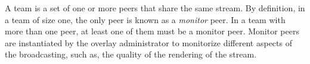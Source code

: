 
\label{sec:team_def}

A team is a set of one or more peers that share the same stream. By
definition, in a team of size one, the only peer is known as a
\emph{monitor} peer. In a team with more than one peer, at least one
of them must be a monitor peer. Monitor peers are instantiated by the
overlay administrator to monitorize different aspects of the
broadcasting, such as, the quality of the rendering of the stream.
